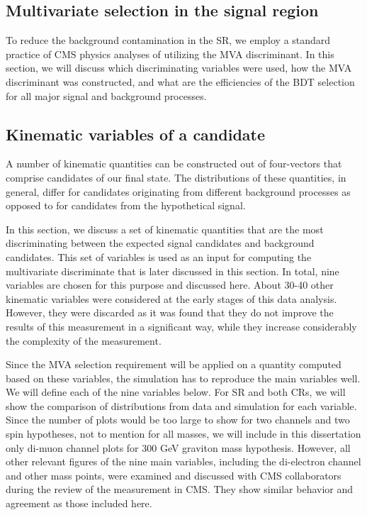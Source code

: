 \begin{small}
\section{Multivariate selection in the signal region}

To reduce the background contamination in the SR, we employ a standard practice of CMS physics analyses of utilizing the MVA discriminant. In this section, we will discuss which discriminating variables were used, how the MVA discriminant was constructed, and what are the efficiencies of the BDT selection for all major signal and background processes. 
\label{sec:BDT}

\subsection{Kinematic variables of a candidate}
\label{variables}

A  number of kinematic quantities can be constructed out of four-vectors that comprise candidates of our final state.  The distributions of these quantities, in general, differ for candidates originating from different background processes as opposed to for candidates from the hypothetical signal. 
           
In this section, we discuss a set of kinematic quantities that are the most discriminating between the expected signal candidates and background candidates. This set of variables is used as an input for computing the multivariate discriminate that is later discussed in this section. In total, nine variables are chosen for this purpose and discussed here. About 30-40 other kinematic variables were considered at the early stages of this data analysis. However, they were discarded as it was found that they do not improve the results of this measurement in a  significant way, while they increase considerably the complexity of the measurement.
           
Since the MVA selection requirement will be applied on a quantity computed based on these variables, the simulation has to reproduce the main variables well. We will define each of the nine variables below. For SR and both CRs, we will show the comparison of distributions from data and simulation for each variable. Since the number of plots would be too large to show for two channels and two spin hypotheses, not to mention for all masses, we will include in this dissertation only di-muon channel plots for 300 GeV graviton mass hypothesis. However, all other relevant figures of the nine main variables, including the di-electron channel and other mass points,  were examined and discussed with CMS collaborators during the review of the measurement in CMS. They show similar behavior and agreement as those included here.
           

\end{small}

